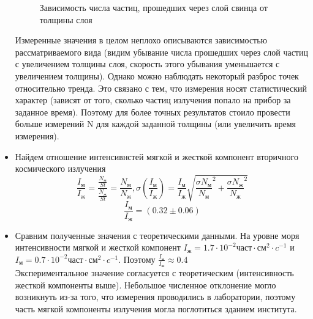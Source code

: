 \documentclass[a4paper,12pt]{article} %
\begin{document}
\begin{itemize}
\begin{figure}[h!]
\caption{Зависимость числа частиц, прошедших через слой свинца от толщины слоя}
\end{figure}
Измеренные значения в целом неплохо описываются зависимостью рассматриваемого вида (видим убывание числа прошедших через слой частиц с увеличением толщины слоя, скорость этого убывания уменьшается с увеличением толщины). Однако можно наблюдать некоторый разброс точек относительно тренда. Это связано с тем, что измерения носят статистический характер (зависят от того, сколько частиц излучения попало на прибор за заданное время). Поэтому для более точных результатов стоило провести больше измерений N для каждой заданной толщины (или увеличить время измерения). 
\item Найдем отношение интенсивнстей мягкой и жесткой компонент вторичного космического излучения
\begin{equation*}
    \frac{I_\text{м}}{I_\text{ж}} = \frac{\frac{N_\text{м}}{St}}{\frac{N_\text{ж}}{St}} = \frac{N_\text{м}}{N_\text{ж}},
    \sigma ({ \frac{I_\text{м}}{I_\text{ж}}}) =  \frac{I_\text{м}}{I_\text{ж}} \sqrt{{\frac{\sigma N_\text{м}}{N_\text{м}}}^2 + {\frac{\sigma N_\text{ж}}{N_\text{ж}}}^2}
\end{equation*}
\begin{equation*}
    \boxed{ \frac{I_\text{м}}{I_\text{ж}} = (0.32 \pm 0.06)}
\end{equation*}
\item
Сравним полученные значения с теоретическими данными. На уровне моря интенсивности мягкой и жесткой компонент $I_{\text{ж}} = 1.7 \cdot 10^{-2} \text{част} \cdot \text{см}^2 \cdot{c}^{-1}$ и $I_{\text{м}} = 0.7 \cdot 10^{-2} \text{част} \cdot \text{см}^2 \cdot{c}^{-1}$. Поэтому $\frac{I_{\text{м}}}{I_{\text{ж}}} \approx 0.4$\\
Экспериментальное значение согласуется с теоретическим (интенсивность жесткой компоненты выше). Небольшое численное отклонение могло возникнуть из-за того, что измерения проводились в лаборатории, поэтому часть мягкой компоненты излучения могла поглотиться зданием института. 
\end{itemize}
\end{document}
